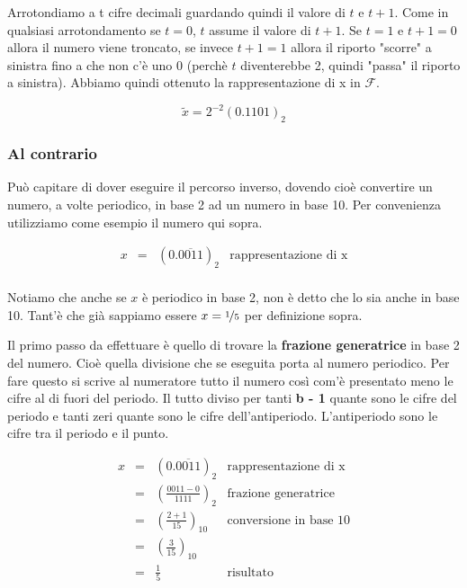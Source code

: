 Arrotondiamo a t cifre decimali guardando quindi il valore di $t$ e $t+1$. Come in qualsiasi arrotondamento se $t = 0$, $t$ assume il valore di $t+1$. Se $t = 1$ e $t+1 = 0$ allora il numero viene troncato, se invece $t+1 = 1$ allora il riporto "scorre" a sinistra fino a che non c'è uno 0 (perchè $t$ diventerebbe 2, quindi "passa" il riporto a sinistra). Abbiamo quindi ottenuto la rappresentazione di x in $\mathcal{F}$.

\begin{equation*}
  \tilde{x} = 2^{-2}(0.1101)_2
\end{equation*}

\subsubsection{Al contrario}
Può capitare di dover eseguire il percorso inverso, dovendo cioè convertire un numero, a volte periodico, in base 2 ad un numero in base 10. Per convenienza utilizziamo come esempio il numero qui sopra.

\[
\renewcommand{\arraystretch}{2.0}
\begin{array}{rclr}
  x & = & (0.\overline{0011})_2 & \text{rappresentazione di x} \\
\end{array}
\]

Notiamo che anche se $x$ è periodico in base 2, non è detto che lo sia anche in base 10. Tant'è che già sappiamo essere $x=\nicefrac{1}{5}$ per definizione sopra.

Il primo passo da effettuare è quello di trovare la \textbf{frazione generatrice} in base 2 del numero. Cioè quella divisione che se eseguita porta al numero periodico. Per fare questo si scrive al numeratore tutto il numero così com'è presentato meno le cifre al di fuori del periodo. Il tutto diviso per tanti \textbf{b - 1} quante sono le cifre del periodo e tanti zeri quante sono le cifre dell'antiperiodo. L'antiperiodo sono le cifre tra il periodo e il punto.

\[
\renewcommand{\arraystretch}{2.0}
\begin{array}{rclr}
  x & = & (0.\overline{0011})_2 & \text{rappresentazione di x} \\
    & = & (\frac{0011 - 0}{1111})_2 & \text{frazione generatrice}\\
    & = & (\frac{2+1}{15})_{10} & \text{conversione in base 10}\\
    & = & (\frac{3}{15})_{10} & \text{}\\
    & = & \frac{1}{5} & \text{risultato}\\
\end{array}
\]


